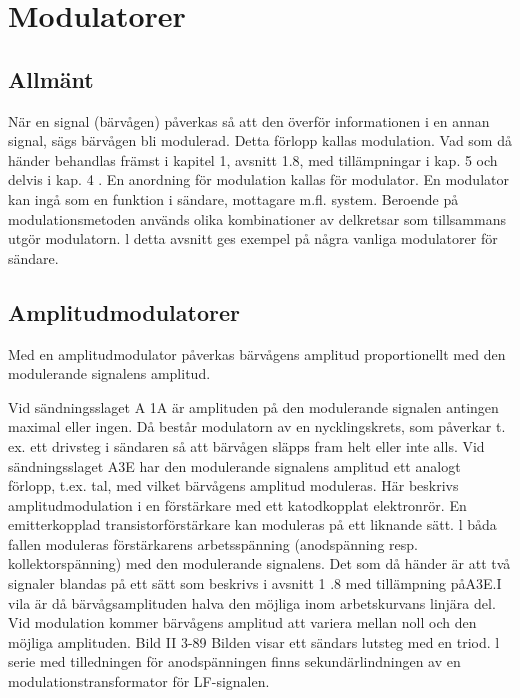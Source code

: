 \section{Modulatorer}

\subsection{Allmänt}

När en signal (bärvågen) påverkas så att
den överför informationen i en annan signal,
sägs bärvågen bli modulerad. Detta förlopp
kallas modulation. Vad som då händer behandlas främst i kapitel 1, avsnitt 1.8, med
tillämpningar i kap. 5 och delvis i kap. 4 .
En anordning för modulation kallas för
modulator. En modulator kan ingå som en
funktion i sändare, mottagare m.fl. system.
Beroende på modulationsmetoden används
olika kombinationer av delkretsar som tillsammans utgör modulatorn.
l detta avsnitt ges exempel på några
vanliga modulatorer för sändare.

\subsection{Amplitudmodulatorer}

Med en amplitudmodulator påverkas bärvågens amplitud proportionellt med den modulerande signalens amplitud.

Vid sändningsslaget A 1A är amplituden
på den modulerande signalen antingen maximal eller ingen. Då består modulatorn av en
nycklingskrets, som påverkar t. ex. ett drivsteg i sändaren så att bärvågen släpps fram
helt eller inte alls.
Vid sändningsslaget A3E har den modulerande signalens amplitud ett analogt förlopp, t.ex. tal, med vilket bärvågens amplitud moduleras. Här beskrivs amplitudmodulation i en förstärkare med ett katodkopplat
elektronrör. En emitterkopplad transistorförstärkare kan moduleras på ett liknande
sätt. l båda fallen moduleras förstärkarens
arbetsspänning (anodspänning resp. kollektorspänning) med den modulerande signalens. Det som då händer är att två signaler
blandas på ett sätt som beskrivs i avsnitt 1 .8
med tillämpning påA3E.I vila är då bärvågsamplituden halva den möjliga inom arbetskurvans linjära del. Vid modulation kommer
bärvågens amplitud att variera mellan noll
och den möjliga amplituden.
Bild II 3-89
Bilden visar ett sändars lutsteg med en triod.
l serie med tilledningen för anodspänningen
finns sekundärlindningen av en modulationstransformator för LF-signalen.

